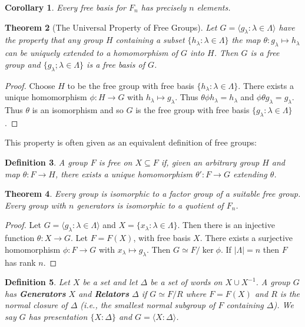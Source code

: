 \documentclass[a4paper,10pt]{article}
\newtheorem{thm}{Theorem}
\newtheorem{Def}[thm]{Definition}
\newtheorem{Cor}[thm]{Corollary}
\begin{document}
\begin{Cor}
Every free basis for $F_n$ has precisely $n$ elements. 
\end{Cor}


\begin{thm}[The Universal Property of Free Groups]
Let $G = \langle g_\lambda : \lambda \in \Lambda \rangle$ have the property that any group $H$ containing a subset $\{h_\lambda : \lambda \in \Lambda \}$ the map $\theta : g_\lambda \mapsto h_\lambda$ can be uniquely extended to a homomorphism of $G$ into $H$. Then $G$ is a free group and $\{g_\lambda ; \lambda \in \Lambda\}$ is a free basis of $G$. 
\end{thm}
\begin{proof}
Choose $H$ to be the free group with free basis $\{ h_\lambda : \lambda \in \Lambda\}$. There exists a unique homomorphism $\phi : H \rightarrow G$ with $h_\lambda \mapsto g_\lambda$. Thus $\theta\phi h_\lambda = h_\lambda$ and $\phi \theta g_\lambda = g_\lambda$. Thus $\theta$ is an isomorphism and so $G$ is the free group with free basis $\{ g_\lambda : \lambda \in \Lambda \}$.
\end{proof}

This property is often given as an equivalent definition of free groups:
\begin{Def}
A group $F$ is free on $X \subseteq F$ if, given an arbitrary group $H$ and map $\theta: F \rightarrow H$, there exists a unique homomorphism $\theta' : F \rightarrow G$ extending $\theta$. 
\end{Def}

\begin{thm}
Every group is isomorphic to a factor group of a suitable free group. Every group with $n$ generators is isomorphic to a quotient of $F_n$. 
\end{thm}
\begin{proof}
Let $G = \langle g_\lambda : \lambda \in \Lambda\rangle$ and $X = \{ x_\lambda : \lambda \in \Lambda \}$. Then there is an injective function $\theta : X \rightarrow G$. Let $F = F(X)$, with free basis $X$. There exists a surjective homomorphism $\phi : F \rightarrow G$ with $x_\lambda \mapsto g_\lambda$. Then $G \simeq F / \ker \phi$. If $|\Lambda| = n$ then $F$ has rank $n$. 
\end{proof}

\begin{Def}
Let $X$ be a set and let $\Delta$ be a set of words on $X \cup X^{-1}$. A group $G$ has \textbf{Generators} $X$ and \textbf{Relators} $\Delta$ if $G \simeq F / R$ where $F = F(X)$ and $R$ is the normal closure of $\Delta$ (i.e., the smallest normal subgroup of $F$ containing $\Delta$). We say $G$ has presentation $\{ X : \Delta \}$ and $G = \langle X : \Delta \rangle$. 
\end{Def}
\end{document}
